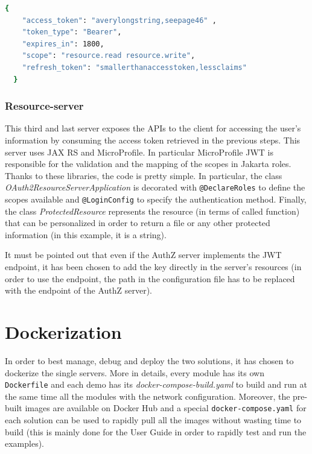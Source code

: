 \begin{lstlisting}[language=bash, basicstyle=\fontsize{12}{14}\ttfamily]
  {
    "access_token": "averylongstring,seepage46" ,
    "token_type": "Bearer",  
    "expires_in": 1800,
    "scope": "resource.read resource.write",
    "refresh_token": "smallerthanaccesstoken,lessclaims"
  }
\end{lstlisting}

\subsubsection{Resource-server}
This third and last server exposes the APIs to the client for accessing the user's information by consuming the access token retrieved in the previous steps. This server uses JAX RS and MicroProfile. In particular MicroProfile JWT is responsible for the validation and the mapping of the scopes in Jakarta roles. Thanks to these libraries, the code is pretty simple. In particular, the class \textit{OAuth2ResourceServerApplication} is decorated with \texttt{@DeclareRoles} to define the scopes available and \texttt{@LoginConfig} to specify the authentication method. Finally, the class \textit{ProtectedResource} represents the resource (in terms of called function) that can be personalized in order to return a file or any other protected information (in this example, it is a string).

It must be pointed out that even if the AuthZ server implements the JWT endpoint, it has been chosen to add the key directly in the server's resources (in order to use the endpoint, the path in the configuration file has to be replaced with the endpoint of the AuthZ server).

\section{Dockerization}
In order to best manage, debug and deploy the two solutions, it has chosen to dockerize the single servers. More in details, every module has its own \texttt{Dockerfile} and each demo has its \textit{docker-compose-build.yaml} to build and run at the same time all the modules with the network configuration. Moreover, the pre-built images are available on Docker Hub and a special \texttt{docker-compose.yaml} for each solution can be used to rapidly pull all the images without wasting time to build (this is mainly done for the User Guide in order to rapidly test and run the examples).

